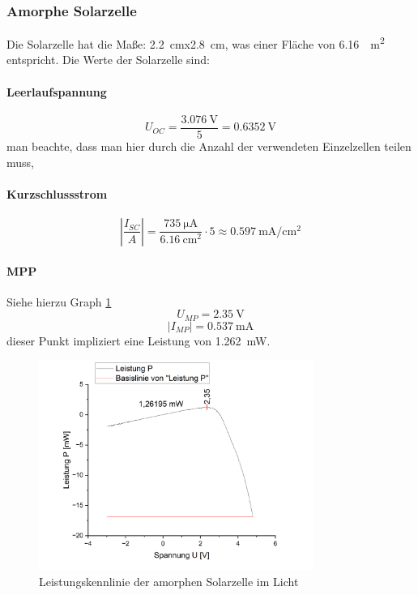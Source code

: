\documentclass[12pt,a4paper,ngerman]{report}
\begin{document}
		
		\subsubsection{Amorphe Solarzelle}
		Die Solarzelle hat die Maße: \qty{2,2}{\centi\m}x\qty{2,8}{\centi\m}, was einer Fläche von \qty{6,16}{\centi\square\metre} entspricht. Die Werte der Solarzelle sind:
		
		\paragraph{Leerlaufspannung}
		\[	U_{OC} = \frac{\qty{3,076}{\volt}}{5} = \qty{0,6352}{\volt} \]
		man beachte, dass man hier durch die Anzahl der verwendeten Einzelzellen teilen muss,
		
		\paragraph{Kurzschlussstrom}
		$$\left|\frac{I_{SC}}{A}\right|=\frac{\qty{735}{\micro\ampere}}{\qty{6,16}{\centi\square\metre}}\cdot 5  \approx\qty{0,597}{\milli\ampere\per\centi\square\metre}$$
		
		\paragraph{MPP} Siehe hierzu Graph \ref{fig:Leistamorphhell}
		$$U_{MP}=\qty{2,35}{\volt}$$ $$\vert I_{MP}\vert=\qty{0,537}{\milli\ampere}$$ 
		dieser Punkt impliziert eine Leistung von \qty{1,262}{\milli\watt}.
		
		\begin{figure}
			\centering
			\includegraphics[width=0.8\textwidth]{Origin/LeistungAmorph.png}
			\caption{Leistungskennlinie der amorphen Solarzelle im Licht}
			\label{fig:Leistamorphhell}
		\end{figure}
		
\end{document}
